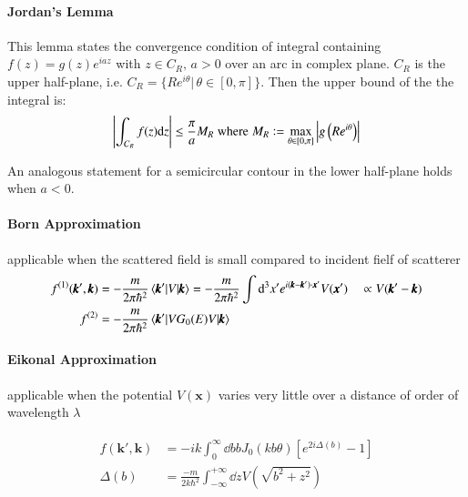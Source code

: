 \paragraph{Jordan's Lemma}
This lemma states the convergence condition of integral containing $f(z) = g(z) e^{iaz}$ with $z \in C_R,\, a>0$ over an arc in complex plane. $C_R$ is the upper half-plane, i.e. $C_R = \{ R e^{i\theta} | \,\theta \in [0, \pi] \}$. Then the upper bound of the the integral is:
\begin{align}
	\left| \int_{C_R} f(z) \dd z \right| \leq \frac{\pi}{a}M_R \;\text{where}\; M_R \vcentcolon = \max_{\theta \in [0,\pi]} \left| g \left(R e^{i \theta}\right) \right|
\end{align}

An analogous statement for a semicircular contour in the lower half-plane holds when $a < 0$.

\paragraph{Born Approximation} applicable when the scattered field is small compared to incident fielf of scatterer
\begin{align}
	f^{(1)}(\pmb{k}',\pmb{k}) &=  - \frac{m}{2\pi\hbar^2}\braket{\pmb{k}' | V | \pmb{k}} = - \frac{m}{2\pi\hbar^2}\int \dd^3 x' e^{i(\pmb{k}-\pmb{k}')\cdot \pmb{x}'} V(\pmb{x}') \quad \propto V(\pmb{k}'- \pmb{k}) \\
	f^{(2)} &= - \frac{m}{2\pi\hbar^2} \braket{ \pmb{k}' | V G_0(E) V | \pmb{k}} 
\end{align}

\paragraph{Eikonal Approximation} applicable when the potential $V(\pmb{x})$ varies very little over a distance of order of wavelength $\lambda$

\begin{align}
\begin{split}
	f(\pmb{k}', \pmb{k}) &= -ik \int^{\infty}_0 \dd b b J_0(kb \theta)[e^{2i\Delta(b)}-1] \\
	\Delta(b) &= \frac{-m}{2k\hbar^2}\int^{+\infty}_{-\infty} \dd z V(\sqrt{b^2+z^2})
\end{split}
\end{align}
